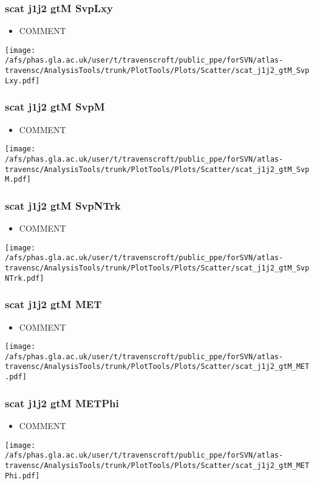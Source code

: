 \documentclass{beamer}
\begin{document}
\begin{frame}
\frametitle{scat j1j2 gtM SvpLxy}
\begin{itemize}
\item COMMENT
\end{itemize}
\begin{center}
\texttt{[image: /afs/phas.gla.ac.uk/user/t/travenscroft/public\_ppe/forSVN/atlas-travensc/AnalysisTools/trunk/PlotTools/Plots/Scatter/scat\_j1j2\_gtM\_SvpLxy.pdf]}
\end{center}
\end{frame}

\begin{frame}
\frametitle{scat j1j2 gtM SvpM}
\begin{itemize}
\item COMMENT
\end{itemize}
\begin{center}
\texttt{[image: /afs/phas.gla.ac.uk/user/t/travenscroft/public\_ppe/forSVN/atlas-travensc/AnalysisTools/trunk/PlotTools/Plots/Scatter/scat\_j1j2\_gtM\_SvpM.pdf]}
\end{center}
\end{frame}

\begin{frame}
\frametitle{scat j1j2 gtM SvpNTrk}
\begin{itemize}
\item COMMENT
\end{itemize}
\begin{center}
\texttt{[image: /afs/phas.gla.ac.uk/user/t/travenscroft/public\_ppe/forSVN/atlas-travensc/AnalysisTools/trunk/PlotTools/Plots/Scatter/scat\_j1j2\_gtM\_SvpNTrk.pdf]}
\end{center}
\end{frame}

\begin{frame}
\frametitle{scat j1j2 gtM MET}
\begin{itemize}
\item COMMENT
\end{itemize}
\begin{center}
\texttt{[image: /afs/phas.gla.ac.uk/user/t/travenscroft/public\_ppe/forSVN/atlas-travensc/AnalysisTools/trunk/PlotTools/Plots/Scatter/scat\_j1j2\_gtM\_MET.pdf]}
\end{center}
\end{frame}

\begin{frame}
\frametitle{scat j1j2 gtM METPhi}
\begin{itemize}
\item COMMENT
\end{itemize}
\begin{center}
\texttt{[image: /afs/phas.gla.ac.uk/user/t/travenscroft/public\_ppe/forSVN/atlas-travensc/AnalysisTools/trunk/PlotTools/Plots/Scatter/scat\_j1j2\_gtM\_METPhi.pdf]}
\end{center}
\end{frame}
\end{document}
